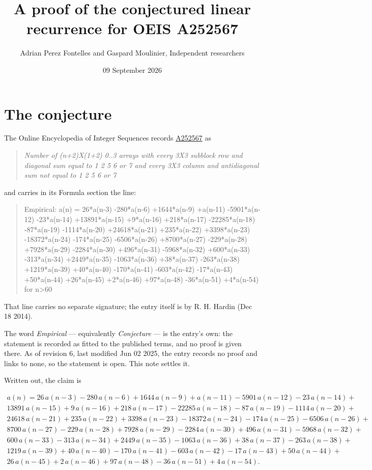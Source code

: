 \documentclass[11pt]{article}
\title{A proof of the conjectured linear recurrence for OEIS A252567}
\author{Adrian Perez Fontelles and Gaspard Moulinier, Independent researchers}
\date{09 September 2026}
\theoremstyle{definition}
\begin{document}
\maketitle
\section{The conjecture}

The Online Encyclopedia of Integer Sequences records \href{https://oeis.org/A252567}{A252567} as

\begin{quote}\itshape Number of (n+2)X(1+2) 0..3 arrays with every 3X3 subblock row and diagonal sum equal to 1 2 5 6 or 7 and every 3X3 column and antidiagonal sum not equal to 1 2 5 6 or 7\end{quote}

and carries in its Formula section the line:

\begin{quote}\ttfamily Empirical: a(n) = 26*a(n-3) -280*a(n-6) +1644*a(n-9) +a(n-11) -5901*a(n-12) -23*a(n-14) +13891*a(n-15) +9*a(n-16) +218*a(n-17) -22285*a(n-18) -87*a(n-19) -1114*a(n-20) +24618*a(n-21) +235*a(n-22) +3398*a(n-23) -18372*a(n-24) -174*a(n-25) -6506*a(n-26) +8700*a(n-27) -229*a(n-28) +7928*a(n-29) -2284*a(n-30) +496*a(n-31) -5968*a(n-32) +600*a(n-33) -313*a(n-34) +2449*a(n-35) -1063*a(n-36) +38*a(n-37) -263*a(n-38) +1219*a(n-39) +40*a(n-40) -170*a(n-41) -603*a(n-42) -17*a(n-43) +50*a(n-44) +26*a(n-45) +2*a(n-46) +97*a(n-48) -36*a(n-51) +4*a(n-54) for n>60\end{quote}

That line carries no separate signature; the entry itself is by R. H. Hardin (Dec 18 2014).

The word {\itshape Empirical} --- equivalently {\itshape Conjecture} --- is the entry's own: the statement is recorded as fitted to the published terms, and no proof is given there. As of revision 6, last modified Jun 02 2025, the entry records no proof and links to none, so the statement is open. This note settles it.

Written out, the claim is

\begin{multline*} a(n) = 26\,a(n-3) - 280\,a(n-6) + 1644\,a(n-9) + a(n-11) - 5901\,a(n-12) - 23\,a(n-14) + \\ 13891\,a(n-15) + 9\,a(n-16) + 218\,a(n-17) - 22285\,a(n-18) - 87\,a(n-19) - 1114\,a(n-20) + \\ 24618\,a(n-21) + 235\,a(n-22) + 3398\,a(n-23) - 18372\,a(n-24) - 174\,a(n-25) - 6506\,a(n-26) + \\ 8700\,a(n-27) - 229\,a(n-28) + 7928\,a(n-29) - 2284\,a(n-30) + 496\,a(n-31) - 5968\,a(n-32) + \\ 600\,a(n-33) - 313\,a(n-34) + 2449\,a(n-35) - 1063\,a(n-36) + 38\,a(n-37) - 263\,a(n-38) + \\ 1219\,a(n-39) + 40\,a(n-40) - 170\,a(n-41) - 603\,a(n-42) - 17\,a(n-43) + 50\,a(n-44) + \\ 26\,a(n-45) + 2\,a(n-46) + 97\,a(n-48) - 36\,a(n-51) + 4\,a(n-54). \end{multline*}
\end{document}

